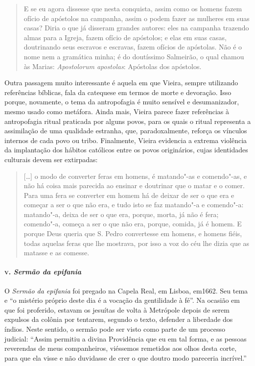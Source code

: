 \begin{quote}
E se eu agora dissesse que nesta conquista, assim como os homens fazem
ofício de apóstolos na campanha, assim o podem fazer as mulheres em suas
casas? Diria o que já disseram grandes autores: eles na campanha
trazendo almas para a Igreja, fazem ofício de apóstolos; e elas em suas
casas, doutrinando seus escravos e escravas, fazem ofícios de apóstolas.
Não é o nome nem a gramática minha; é do doutíssimo Salmeirão, o qual
chamou às Marias: \emph{Apostolorum apostolas}: Apóstolas dos
apóstolos.
\end{quote}

Outra passagem muito interessante é aquela em que Vieira, sempre
utilizando referências bíblicas, fala da catequese em termos de morte e
devoração. Isso porque, novamente, o tema da antropofagia é muito
sensível e desumanizador, mesmo usado como metáfora. Ainda mais, Vieira
parece fazer referências à antropofagia ritual praticada por alguns
povos, para os quais o ritual representa a assimilação de uma qualidade
estranha, que, paradoxalmente, reforça os vínculos internos de cada povo
ou tribo. Finalmente, Vieira evidencia a extrema violência da
implantação dos hábitos católicos entre os povos originários, cujas
identidades culturais devem ser extirpadas:

\begin{quote}
{[}\ldots{}{]} o modo de converter feras em homens, é matando"-as e
comendo"-as, e não há coisa mais parecida ao ensinar e doutrinar que o
matar e o comer. Para uma fera se converter em homem há de deixar de ser
o que era e começar a ser o que não era, e tudo isto se faz matando"-a e
comendo"-a: matando"-a, deixa de ser o que era, porque, morta, já não é
fera; comendo"-a, começa a ser o que não era, porque, comida, já é homem.
E porque Deus queria que S. Pedro convertesse em homens, e homens fiéis,
todas aquelas feras que lhe mostrava, por isso a voz do céu lhe dizia
que as matasse e as comesse.
\end{quote}

\paragraph{\textsc{v}. \emph{Sermão da epifania}}

O \emph{Sermão da epifania} foi pregado na Capela Real, em Lisboa,
em1662. Seu tema e ``o mistério próprio deste dia é a vocação da
gentilidade à fé''. Na ocasião em que foi proferido, estavam os jesuítas
de volta à Metrópole depois de serem expulsos da colônia por tentarem,
segundo o texto, defender a liberdade dos índios. Neste sentido, o
sermão pode ser visto como parte de um processo judicial: ``Assim
permitiu a divina Providência que eu em tal forma, e as pessoas
reverendas de meus companheiros, viéssemos remetidos aos olhos desta
corte, para que ela visse e não duvidasse de crer o que doutro modo
pareceria incrível.''

